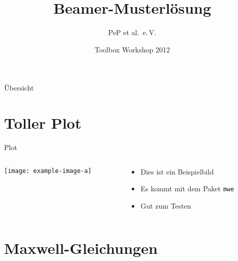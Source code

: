 \documentclass{beamer}
\author{PeP et al.\ e.\,V.}
\institute{TU Dortmund}
\date{Toolbox Workshop 2012}
\title{Beamer-Musterlösung}
\begin{document}
\begin{frame}
  \maketitle
\end{frame}

\begin{frame}{Übersicht}
  \tableofcontents
\end{frame}

\section{Toller Plot}

\begin{frame}{Plot}
  \begin{columns}[c, onlytextwidth]
    \begin{column}{0.42\textwidth}
      \texttt{[image: example-image-a]}
    \end{column}
    \begin{column}{0.52\textwidth}
      \begin{itemize}
        \item Dies ist ein Beispielbild
        \item Es kommt mit dem Paket \texttt{mwe}
        \item Gut zum Testen
      \end{itemize}
    \end{column}
  \end{columns}
\end{frame}

\section{Maxwell-Gleichungen}
\end{document}
